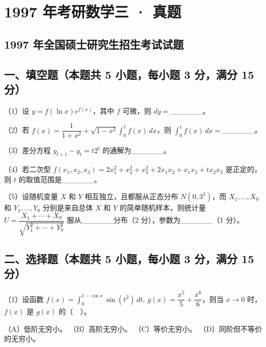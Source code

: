 \documentclass[UTF8,12pt]{ctexart}
\begin{document}
\section*{1997 年考研数学三 · 真题}
\subsection*{1997 年全国硕士研究生招生考试试题}

\subsection*{一、填空题（本题共 5 小题，每小题 3 分，满分 15 分）}

（1）设 \(\displaystyle y=f(\ln x)e^{f(x)}\)，其中 \(\displaystyle f\) 可微，则 \(\displaystyle dy=\)\_\_\_\_\_\_。


（2）若 \(\displaystyle f(x)=\dfrac{\displaystyle 1}{\displaystyle 1+x^2}+\sqrt{1-x^2}\displaystyle \int_0^1f(x)\,dx\)，则 \(\displaystyle \int_0^1f(x)\,dx=\)\_\_\_\_\_\_。


（3）差分方程 \(\displaystyle y_{t+1}-y_t=t2^t\) 的通解为\_\_\_\_\_\_。


（4）若二次型 \(\displaystyle f(x_1,\allowbreak x_2,\allowbreak x_3)=2x_1^2+x_2^2+x_3^2+2x_1x_2+x_1x_3+tx_2x_3\) 是正定的，则 \(\displaystyle t\) 的取值范围是\_\_\_\_\_\_。


（5）设随机变量 \(\displaystyle X\) 和 \(\displaystyle Y\) 相互独立，且都服从正态分布 \(\displaystyle N(0,\allowbreak 3^2)\)，而 \(\displaystyle X_1,\allowbreak \ldots,\allowbreak X_9\) 和 \(\displaystyle Y_1,\allowbreak \ldots,\allowbreak Y_9\) 分别是来自总体 \(\displaystyle X\) 和 \(\displaystyle Y\) 的简单随机样本，则统计量 \(\displaystyle U=\dfrac{\displaystyle X_1+\cdots+X_9}{\displaystyle \sqrt{Y_1^2+\cdots+Y_9^2}}\) 服从\_\_\_\_\_\_分布（2 分），参数为\_\_\_\_\_\_（1 分）。


\subsection*{二、选择题（本题共 5 小题，每小题 3 分，满分 15 分）}

（1）设函数 \(\displaystyle f(x)=\displaystyle \int_0^{1-\cos x}\sin(t^2)\,dt,\allowbreak \ g(x)=\dfrac{\displaystyle x^5}{\displaystyle 5}+\dfrac{\displaystyle x^6}{\displaystyle 6}\)，则当 \(\displaystyle x\to0\) 时，\(\displaystyle f(x)\) 是 \(\displaystyle g(x)\) 的（　）。


（A）低阶无穷小。 （B）高阶无穷小。 （C）等价无穷小。 （D）同阶但不等价的无穷小。
\end{document}
